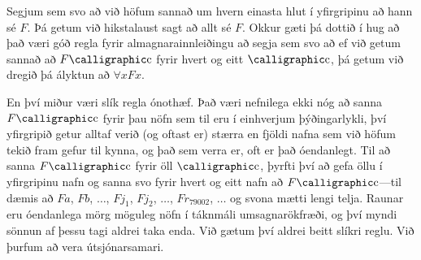 Segjum sem svo að við höfum sannað um hvern einasta hlut í yfirgripinu að hann sé $F$. Þá getum við hikstalaust sagt að allt sé $F$. Okkur gæti þá dottið í hug að það væri góð regla fyrir almagnarainnleiðingu að segja sem svo að ef við getum sannað að $F\meta{c}$ fyrir hvert og eitt $\meta{c}$, þá getum við dregið þá ályktun að $\forall x Fx$. 

En því miður væri slík regla ónothæf. Það væri nefnilega ekki nóg að sanna $F\meta{c}$ fyrir þau nöfn sem til eru í einhverjum þýðingarlykli, því yfirgripið getur alltaf verið (og oftast er) stærra en fjöldi nafna sem við höfum tekið fram gefur til kynna, og það sem verra er, oft er það óendanlegt. Til að sanna $F\meta{c}$ fyrir öll $\meta{c}$, þyrfti því að gefa öllu í yfirgripinu nafn og sanna svo fyrir hvert og eitt nafn að $F\meta{c}$---til dæmis að $Fa$, $Fb$, $\ldots$, $Fj_1$, $Fj_2$, $\ldots$, $Fr_{79002}$, $\ldots$ og svona mætti lengi telja. Raunar eru óendanlega mörg möguleg nöfn í táknmáli umsagnarökfræði, og því myndi sönnun af þessu tagi aldrei taka enda. Við gætum því aldrei beitt slíkri reglu. Við þurfum að vera útsjónarsamari.

